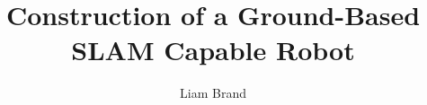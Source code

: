 \documentclass[a4paper,11pt,nocenter,bold,notitlepage,noheadline,noindent]{thesis}
\title{Construction of a Ground-Based SLAM Capable Robot}
\author{Liam Brand}
\date{}
\begin{document}
	\maketitle
	\tableofcontents
	\listoffigures
	\listoftables
	
	
	
	
	
	
	\nocite{stachniss2013robotmappingintro}
	
\end{document}
